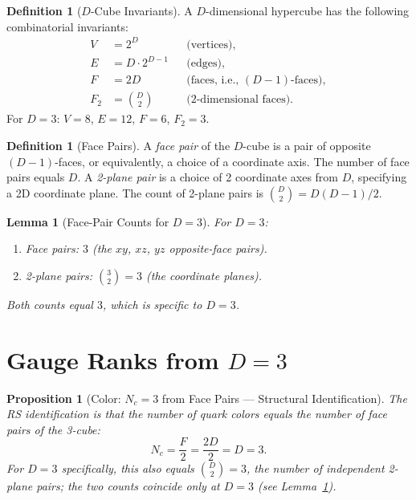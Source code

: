 \documentclass[12pt,a4paper]{article}
\newtheorem{lemma}[theorem]{Lemma}
\newtheorem{proposition}[theorem]{Proposition}
\theoremstyle{definition}
\newtheorem{definition}[theorem]{Definition}
\theoremstyle{remark}
\begin{document}
\begin{definition}[$D$-Cube Invariants]
\label{def:cube}
A $D$-dimensional hypercube has the following combinatorial
invariants:
\begin{align}
  V &= 2^D & &\text{(vertices)}, \\
  E &= D \cdot 2^{D-1} & &\text{(edges)}, \\
  F &= 2D & &\text{(faces, i.e., $(D-1)$-faces)}, \\
  F_2 &= \binom{D}{2} & &\text{(2-dimensional faces)}.
\end{align}
For $D = 3$: $V = 8$, $E = 12$, $F = 6$, $F_2 = 3$.
\end{definition}

\begin{definition}[Face Pairs]
\label{def:face-pairs}
A \emph{face pair} of the $D$-cube is a pair of opposite
$(D-1)$-faces, or equivalently, a choice of a coordinate axis.
The number of face pairs equals $D$.  A \emph{2-plane pair} is
a choice of 2 coordinate axes from $D$, specifying a 2D
coordinate plane.  The count of 2-plane pairs is
$\binom{D}{2} = D(D-1)/2$.
\end{definition}

\begin{lemma}[Face-Pair Counts for $D = 3$]
\label{lem:d3}
For $D = 3$:
\begin{enumerate}[label=(\roman*)]
  \item Face pairs: $3$ (the $xy$, $xz$, $yz$ opposite-face
  pairs).
  \item 2-plane pairs: $\binom{3}{2} = 3$ (the coordinate
  planes).
\end{enumerate}
Both counts equal $3$, which is specific to $D = 3$.
\end{lemma}

\section{Gauge Ranks from $D = 3$}
\label{sec:ranks}

\begin{proposition}[Color: $N_c = 3$ from Face Pairs --- Structural Identification]
\label{thm:nc}
The RS identification is that the number of quark colors equals the number of
face pairs of the 3-cube:
\begin{equation}
  N_c = \frac{F}{2} = \frac{2D}{2} = D = 3.
  \label{eq:nc}
\end{equation}
For $D = 3$ specifically, this also equals $\binom{D}{2} = 3$,
the number of independent 2-plane pairs; the two counts
coincide only at $D = 3$ (see Lemma~\ref{lem:d3}).
\end{proposition}
\end{document}
